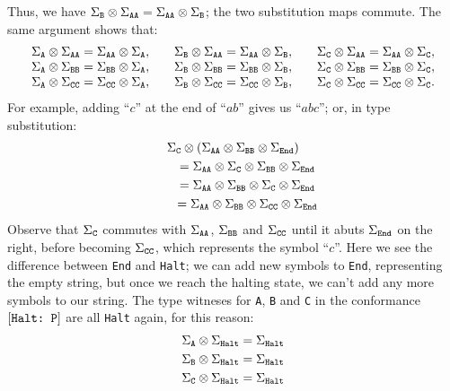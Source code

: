 \documentclass[../generics]{subfiles}
\begin{document}
Thus, we have $\Sigma_{\texttt{B}}\otimes\Sigma_{\texttt{AA}} = \Sigma_{\texttt{AA}}\otimes\Sigma_{\texttt{B}}$; the two substitution maps commute. The same argument shows that:
\[
\begin{array}{lllll}
\Sigma_{\texttt{A}}\otimes\Sigma_{\texttt{AA}}=\Sigma_{\texttt{AA}}\otimes\Sigma_{\texttt{A}},&&\Sigma_{\texttt{B}}\otimes\Sigma_{\texttt{AA}}=\Sigma_{\texttt{AA}}\otimes\Sigma_{\texttt{B}},&&\Sigma_{\texttt{C}}\otimes\Sigma_{\texttt{AA}}=\Sigma_{\texttt{AA}}\otimes\Sigma_{\texttt{C}},\\
\Sigma_{\texttt{A}}\otimes\Sigma_{\texttt{BB}}=\Sigma_{\texttt{BB}}\otimes\Sigma_{\texttt{A}},&&\Sigma_{\texttt{B}}\otimes\Sigma_{\texttt{BB}}=\Sigma_{\texttt{BB}}\otimes\Sigma_{\texttt{B}},&&\Sigma_{\texttt{C}}\otimes\Sigma_{\texttt{BB}}=\Sigma_{\texttt{BB}}\otimes\Sigma_{\texttt{C}},\\
\Sigma_{\texttt{A}}\otimes\Sigma_{\texttt{CC}}=\Sigma_{\texttt{CC}}\otimes\Sigma_{\texttt{A}},&&\Sigma_{\texttt{B}}\otimes\Sigma_{\texttt{CC}}=\Sigma_{\texttt{CC}}\otimes\Sigma_{\texttt{B}},&&\Sigma_{\texttt{C}}\otimes\Sigma_{\texttt{CC}}=\Sigma_{\texttt{CC}}\otimes\Sigma_{\texttt{C}}.\\
\end{array}
\]
For example, adding ``$c$'' at the end of ``$ab$'' gives us ``$abc$''; or, in type substitution:
\begin{gather*}
\Sigma_{\texttt{C}}\otimes\left(\Sigma_{\texttt{AA}}\otimes\Sigma_{\texttt{BB}}\otimes\Sigma_{\texttt{End}}\right)\\
\qquad {} = \Sigma_{\texttt{AA}}\otimes\Sigma_{\texttt{C}}\otimes\Sigma_{\texttt{BB}}\otimes\Sigma_{\texttt{End}}\\
\qquad {} = \Sigma_{\texttt{AA}}\otimes\Sigma_{\texttt{BB}}\otimes\Sigma_{\texttt{C}}\otimes\Sigma_{\texttt{End}}\\
\qquad {} = \Sigma_{\texttt{AA}}\otimes\Sigma_{\texttt{BB}}\otimes\Sigma_{\texttt{CC}}\otimes\Sigma_{\texttt{End}}
\end{gather*}
Observe that $\Sigma_{\texttt{C}}$ commutes with $\Sigma_{\texttt{AA}}$, $\Sigma_{\texttt{BB}}$ and $\Sigma_{\texttt{CC}}$ until it abuts $\Sigma_{\texttt{End}}$ on the right, before becoming $\Sigma_{\texttt{CC}}$, which represents the symbol ``$c$''. Here we see the difference between \texttt{End} and \texttt{Halt}; we can add new symbols to \texttt{End}, representing the empty string, but once we reach the halting state, we can't add any more symbols to our string. The type witneses for \texttt{A}, \texttt{B} and \texttt{C} in the conformance $[\texttt{Halt:~P}]$ are all \texttt{Halt} again, for this reason:
\begin{gather*}
\Sigma_{\texttt{A}}\otimes\Sigma_{\texttt{Halt}}=\Sigma_{\texttt{Halt}}\\
\Sigma_{\texttt{B}}\otimes\Sigma_{\texttt{Halt}}=\Sigma_{\texttt{Halt}}\\
\Sigma_{\texttt{C}}\otimes\Sigma_{\texttt{Halt}}=\Sigma_{\texttt{Halt}}
\end{gather*}
\end{document}
